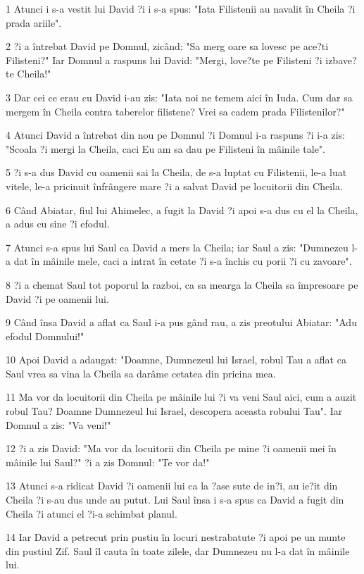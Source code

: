 \par 1 Atunci i s-a vestit lui David ?i i s-a spus: "Iata Filistenii au navalit în Cheila ?i prada ariile".
\par 2 ?i a întrebat David pe Domnul, zicând: "Sa merg oare sa lovesc pe ace?ti Filisteni?" Iar Domnul a raspuns lui David: "Mergi, love?te pe Filisteni ?i izbave?te Cheila!"
\par 3 Dar cei ce erau cu David i-au zis: "Iata noi ne temem aici în Iuda. Cum dar sa mergem în Cheila contra taberelor filistene? Vrei sa cadem prada Filistenilor?"
\par 4 Atunci David a întrebat din nou pe Domnul ?i Domnul i-a raspuns ?i i-a zis: "Scoala ?i mergi la Cheila, caci Eu am sa dau pe Filisteni în mâinile tale".
\par 5 ?i s-a dus David cu oamenii sai la Cheila, de s-a luptat cu Filistenii, le-a luat vitele, le-a pricinuit înfrângere mare ?i a salvat David pe locuitorii din Cheila.
\par 6 Când Abiatar, fiul lui Ahimelec, a fugit la David ?i apoi s-a dus cu el la Cheila, a adus cu sine ?i efodul.
\par 7 Atunci s-a spus lui Saul ca David a mers la Cheila; iar Saul a zis: "Dumnezeu l-a dat în mâinile mele, caci a intrat în cetate ?i s-a închis cu porii ?i cu zavoare".
\par 8 ?i a chemat Saul tot poporul la razboi, ca sa mearga la Cheila sa împresoare pe David ?i pe oamenii lui.
\par 9 Când însa David a aflat ca Saul i-a pus gând rau, a zis preotului Abiatar: "Adu efodul Domnului!"
\par 10 Apoi David a adaugat: "Doamne, Dumnezeul lui Israel, robul Tau a aflat ca Saul vrea sa vina la Cheila sa darâme cetatea din pricina mea.
\par 11 Ma vor da locuitorii din Cheila pe mâinile lui ?i va veni Saul aici, cum a auzit robul Tau? Doamne Dumnezeul lui Israel, descopera aceasta robului Tau". Iar Domnul a zis: "Va veni!"
\par 12 ?i a zis David: "Ma vor da locuitorii din Cheila pe mine ?i oamenii mei în mâinile lui Saul?" ?i a zis Domnul: "Te vor da!"
\par 13 Atunci s-a ridicat David ?i oamenii lui ca la ?ase sute de in?i, au ie?it din Cheila ?i s-au dus unde au putut. Lui Saul însa i s-a spus ca David a fugit din Cheila ?i atunci el ?i-a schimbat planul.
\par 14 Iar David a petrecut prin pustiu în locuri nestrabatute ?i apoi pe un munte din pustiul Zif. Saul îl cauta în toate zilele, dar Dumnezeu nu l-a dat în mâinile lui.
